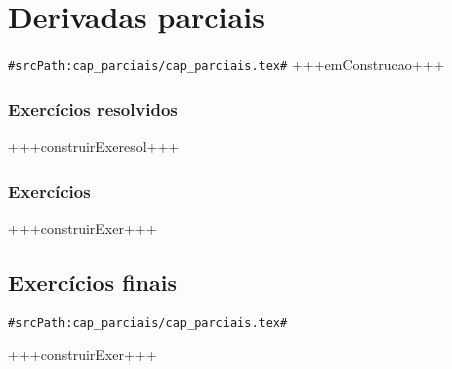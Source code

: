 
\chapter{Derivadas parciais}
\verb+#srcPath:cap_parciais/cap_parciais.tex#+
\label{chap:parciais}
+++emConstrucao+++





\subsection*{Exercícios resolvidos}
+++construirExeresol+++

\subsection*{Exercícios}
+++construirExer+++

\section{Exercícios finais}
\verb+#srcPath:cap_parciais/cap_parciais.tex#+

+++construirExer+++

